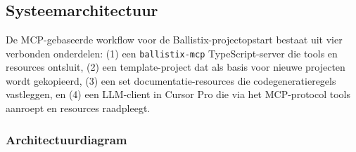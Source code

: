 \section{}
\label{sec:poc-architectuur}

\subsection{Systeemarchitectuur}

De MCP-gebaseerde workflow voor de Ballistix-projectopstart bestaat uit vier verbonden onderdelen: (1) een \texttt{ballistix-mcp} TypeScript-server die tools en resources ontsluit, (2) een template-project dat als basis voor nieuwe projecten wordt gekopieerd, (3) een set documentatie-resources die codegeneratieregels vastleggen, en (4) een LLM-client in Cursor Pro die via het MCP-protocol tools aanroept en resources raadpleegt.

\subsubsection{Architectuurdiagram}

